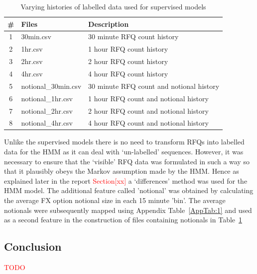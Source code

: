 \begin{table}[!ht]\centering\small
    \caption{Varying histories of labelled data used for supervised models}\label{Ch7Tab1}
    \begin{tabular}{cll}
        \toprule
        \bfseries\# & \bfseries Files & \bfseries Description\\
        \midrule
        1 & 30min.csv           & 30 minute RFQ count history              \\
        2 & 1hr.csv             & 1 hour RFQ count history                 \\
        3 & 2hr.csv             & 2 hour RFQ count history                 \\
        4 & 4hr.csv             & 4 hour RFQ count history                 \\
        5 & notional\_30min.csv & 30 minute RFQ count and notional history \\
        6 & notional\_1hr.csv   & 1 hour RFQ count and notional history    \\
        7 & notional\_2hr.csv   & 2 hour RFQ count and notional history    \\
        8 & notional\_4hr.csv   & 4 hour RFQ count and notional history    \\
        \bottomrule
    \end{tabular}
\end{table}


Unlike the supervised models there is no need to transform RFQs into labelled data for the HMM as it can deal with `un-labelled' sequences. However, it was necessary to ensure that the `visible' RFQ data was formulated in such a way so that it plausibly obeys the Markov assumption made by the HMM. Hence as explained later in the report \textcolor{red}{Section[xx]} a `differences' method was used for the HMM model. The additional feature called 'notional' was obtained by calculating the average FX option notional size in each 15 minute 'bin'. The average notionals were subsequently mapped using Appendix Table~\ref{AppTab:1} and used as a second feature in the construction of files containing notionals in Table~\ref{Ch7Tab1} \\

\subsection{Conclusion}

\textcolor{red}{TODO}